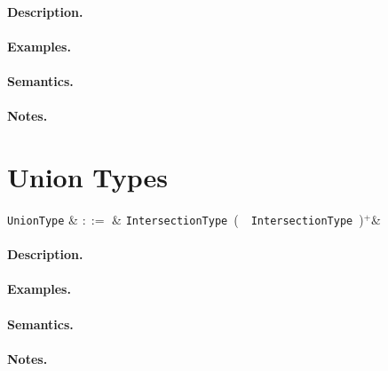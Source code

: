 \paragraph{Description.}

\paragraph{Examples.}

\paragraph{Semantics.}

\paragraph{Notes.} 


\section{Union Types}

\begin{syntax}
  \verb+UnionType+ & $::=$ & \verb+IntersectionType+\ \big(\ \token{|}\ \verb+IntersectionType+\
  \big)$^+$&\\
\end{syntax}

\paragraph{Description.}

\paragraph{Examples.}

\paragraph{Semantics.}

\paragraph{Notes.}


